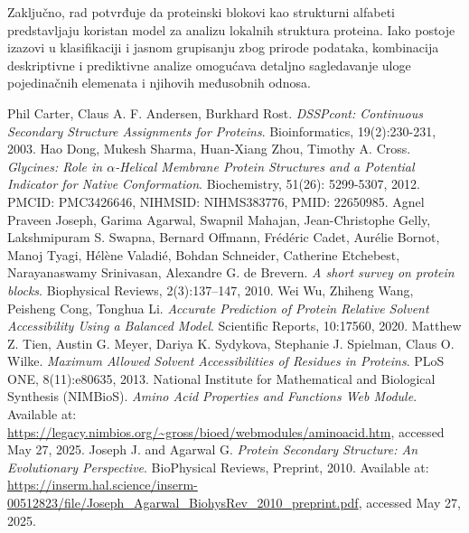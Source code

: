 \documentclass[a4paper,12pt]{article}
\begin{document}
Zaključno, rad potvrđuje da proteinski blokovi kao strukturni alfabeti predstavljaju koristan model za analizu lokalnih struktura proteina. Iako postoje izazovi u klasifikaciji i jasnom grupisanju zbog prirode podataka, kombinacija deskriptivne i prediktivne analize omogućava detaljno sagledavanje uloge pojedinačnih elemenata i njihovih međusobnih odnosa.

\newpage
\begin{thebibliography}{5}
    Phil Carter, Claus A. F. Andersen, Burkhard Rost. 
    \textit{DSSPcont: Continuous Secondary Structure Assignments for Proteins}. 
    Bioinformatics, 19(2):230-231, 2003.
    Hao Dong, Mukesh Sharma, Huan-Xiang Zhou, Timothy A. Cross.  
    \textit{Glycines: Role in $\alpha$-Helical Membrane Protein Structures and a Potential Indicator for Native Conformation}.  
    Biochemistry, 51(26): 5299-5307, 2012.  
    PMCID: PMC3426646, NIHMSID: NIHMS383776, PMID: 22650985.
    Agnel Praveen Joseph, Garima Agarwal, Swapnil Mahajan, 
    Jean-Christophe Gelly, Lakshmipuram S. Swapna, Bernard Offmann, 
    Frédéric Cadet, Aurélie Bornot, Manoj Tyagi, Hélène Valadié, Bohdan Schneider, 
    Catherine Etchebest, Narayanaswamy Srinivasan, Alexandre G. de Brevern.  
    \textit{A short survey on protein blocks}.  
    Biophysical Reviews, 2(3):137–147, 2010.
	Wei Wu, Zhiheng Wang, Peisheng Cong, Tonghua Li.  
	\textit{Accurate Prediction of Protein Relative Solvent Accessibility Using a Balanced Model}.  
	Scientific Reports, 10:17560, 2020.
	Matthew Z. Tien, Austin G. Meyer, Dariya K. Sydykova, Stephanie J. Spielman, Claus O. Wilke.  
	\textit{Maximum Allowed Solvent Accessibilities of Residues in Proteins}.  
	PLoS ONE, 8(11):e80635, 2013.
    National Institute for Mathematical and Biological Synthesis (NIMBioS). 
    \textit{Amino Acid Properties and Functions Web Module}. 
    Available at: \url{https://legacy.nimbios.org/~gross/bioed/webmodules/aminoacid.htm}, accessed May 27, 2025.
    Joseph J. and Agarwal G. 
    \textit{Protein Secondary Structure: An Evolutionary Perspective}. 
    BioPhysical Reviews, Preprint, 2010. 
    Available at: \url{https://inserm.hal.science/inserm-00512823/file/Joseph_Agarwal_BiohysRev_2010_preprint.pdf}, accessed May 27, 2025.

\end{thebibliography}
\end{document}

